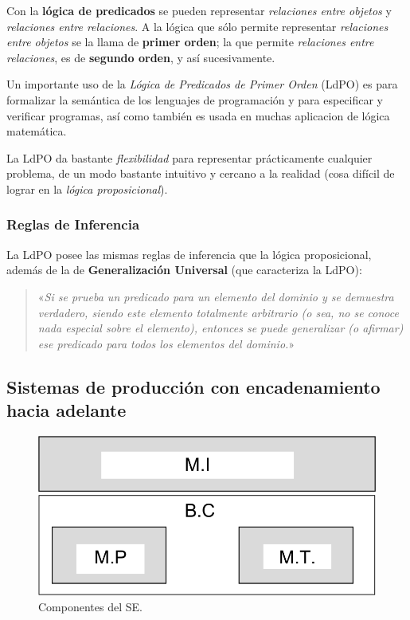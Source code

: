 \documentclass[10pt,a4paper]{article}
\begin{document}
Con la \textbf{lógica de predicados} se pueden representar \textit{relaciones entre objetos} y \textit{relaciones entre relaciones}. A la lógica que sólo permite representar \textit{relaciones entre objetos} se la llama de \textbf{primer orden}; la que permite \textit{relaciones entre relaciones}, es de \textbf{segundo orden}, y así sucesivamente.

Un importante uso de la \textit{Lógica de Predicados de Primer Orden} (LdPO) es para formalizar la semántica de los lenguajes de programación y para especificar y verificar programas, así como también es usada en muchas aplicacion de lógica matemática.

La LdPO da bastante \textit{flexibilidad} para representar prácticamente cualquier problema, de un modo bastante intuitivo y cercano a la realidad (cosa difícil de lograr en la \textit{lógica proposicional}).

\subsubsection{Reglas de Inferencia}

La LdPO posee las mismas reglas de inferencia que la lógica proposicional, además de la de \textbf{Generalización Universal} (que caracteriza la LdPO):
\begin{quote}
«\textit{Si se prueba un predicado para un elemento del dominio y se demuestra verdadero, siendo este elemento totalmente arbitrario (o sea, no se conoce nada especial sobre el elemento), entonces se puede generalizar (o afirmar) ese predicado para todos los elementos del dominio.}»
\end{quote}

\subsection{Sistemas de producción con encadenamiento hacia adelante}

\begin{figure}
  \label{fig:encadenamiento}
  \caption{Componentes del SE.}
  \centering
  \hbox{\includegraphics[width=0.3\textwidth-\fboxrule-\fboxrule]{imgs/encadenamiento.png}}  
\end{figure}
\end{document}
